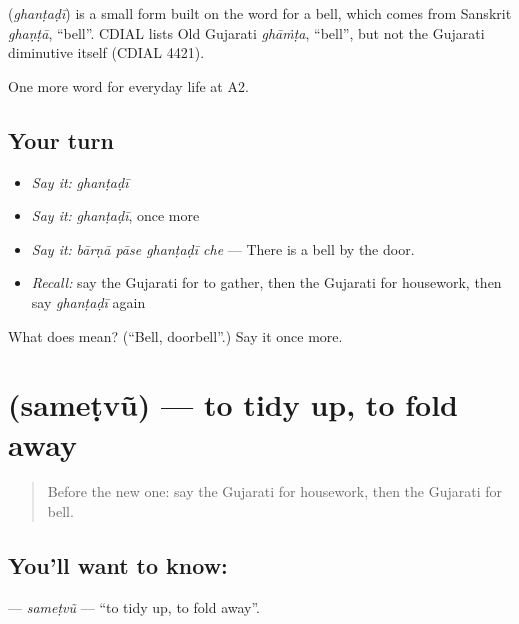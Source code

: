 \begin{cousinweb}
\textbf{} (\emph{ghanṭaḍī}) is a small form built on the word for a bell, which comes from Sanskrit \emph{ghaṇṭā}, \textquotedblleft{}bell\textquotedblright{}. CDIAL lists Old Gujarati \emph{ghāṁṭa}, \textquotedblleft{}bell\textquotedblright{}, but not the Gujarati diminutive itself (CDIAL 4421).
\end{cousinweb}

\begin{grammarlens}[title={What you've built}]
One more word for everyday life at A2.
\end{grammarlens}

\subsection*{Your turn}
\begin{itemize}
\raggedright
  \item \emph{Say it:} \emph{ghanṭaḍī}
  \item \emph{Say it:} \emph{ghanṭaḍī}, once more
  \item \emph{Say it:} \emph{bārṇā pāse ghanṭaḍī che} — There is a bell by the door.
  \item \emph{Recall:} say the Gujarati for to gather, then the Gujarati for housework, then say \emph{ghanṭaḍī} again
\end{itemize}

\begin{tcolorbox}[breakable,colback=teal!4,colframe=teal!35!black,title={Before you move on}]
What does  mean? (\textquotedblleft{}Bell, doorbell\textquotedblright{}.) Say it once more.
\end{tcolorbox}
\section[\texorpdfstring{\gu{સમેટવું} (sameṭvũ)}{સમેટવું (sameṭvũ)}]{ (sameṭvũ) — to tidy up, to fold away}

\label{lesson:GU-C162-sametvu}



\begin{quote}
Before the new one: say the Gujarati for housework, then the Gujarati for bell.
\end{quote}

\subsection*{You'll want to know: }
\textbf{} — \emph{sameṭvũ} — \textquotedblleft{}to tidy up, to fold away\textquotedblright{}.

